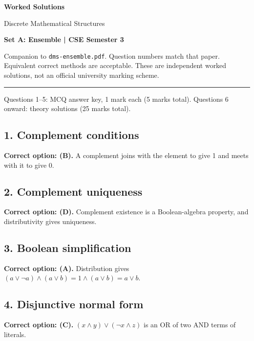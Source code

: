 \documentclass[11pt,a4paper]{article}
\begin{document}
{\LARGE\bfseries Worked Solutions}\par{\large Discrete Mathematical Structures}\par\textbf{Set A: Ensemble | CSE Semester 3}\par
Companion to \texttt{dms-ensemble.pdf}. Question numbers match that paper. Equivalent correct methods are acceptable. These are independent worked solutions, not an official university marking scheme.\par\medskip\hrule\medskip
Questions 1--5: MCQ answer key, 1 mark each (5 marks total). Questions 6 onward: theory solutions (25 marks total).\par
\noindent\begin{minipage}{\linewidth}\subsection*{1. Complement conditions}
\textbf{Correct option: (B).} A complement joins with the element to give 1 and meets with it to give 0.
\end{minipage}\par\medskip
\noindent\begin{minipage}{\linewidth}\subsection*{2. Complement uniqueness}
\textbf{Correct option: (D).} Complement existence is a Boolean-algebra property, and distributivity gives uniqueness.
\end{minipage}\par\medskip
\noindent\begin{minipage}{\linewidth}\subsection*{3. Boolean simplification}
\textbf{Correct option: (A).} Distribution gives $(a\lor\neg a)\land(a\lor b)=1\land(a\lor b)=a\lor b$.
\end{minipage}\par\medskip
\noindent\begin{minipage}{\linewidth}\subsection*{4. Disjunctive normal form}
\textbf{Correct option: (C).} $(x\land y)\lor(\neg x\land z)$ is an OR of two AND terms of literals.
\end{minipage}\par\medskip
\end{document}

